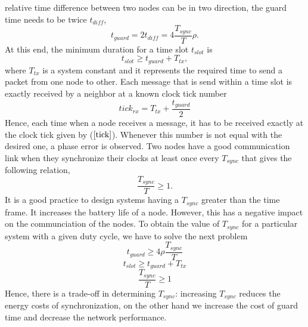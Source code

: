 \documentclass[a4paper,10pt]{report}
\begin{document}
relative time difference between two nodes can be in two direction, the guard time needs to be twice $t_{diff}$,
\begin{equation}
t_{guard}= 2t_{diff} = 4\frac{T_{sync}}{T}\rho.
\end{equation}
At this end, the minimum duration for a time slot $t_{slot}$ is
\begin{equation}
t_{slot} \geq t_{guard} + T_{tx},
\end{equation}
where $T_{tx}$ is a system constant and it represents the required time to send a packet from one node to other. 
\newline Each message that is send within a time slot is exactly received by a neighbor at a known clock tick number
\begin{equation}
tick_{rx} = T_{tx}+ \frac{t_{guard}}{2} \label{tick}
\end{equation}
Hence, each time when a node receives a message, it has to be received exactly at the clock tick given by ($\ref{tick}$). Whenever
this number is not equal with the desired one, a phase error is observed. 
\newline 
Two nodes have a good communication link when they synchronize their clocks at least once every $T_{sync}$ that gives the following
relation,
\begin{equation}
\frac{T_{sync}}{T}\geq 1.
\end{equation}
It is a good practice to design systems having a $T_{sync}$ greater
than the time frame. It increases the battery life of a node. However,
this has a negative impact on the communciation of the nodes.\newline
To obtain the value of $T_{sync}$ for a particular system with a given duty cycle, we have
to solve the next problem
\begin{equation}
t_{guard} \geq 4\rho \frac{T_{sync}}{T}
\end{equation}
\begin{equation}
t_{slot} \geq t_{guard} + T_{tx}
\end{equation}
\begin{equation}
\frac{T_{sync}}{T} \geq 1
\end{equation}
Hence, there is a trade-off in determining $T_{sync}$: increasing $T_{sync}$ reduces the energy costs of synchronization, on the other
hand we increase the cost of guard time and decrease the network performance.
\end{document}
